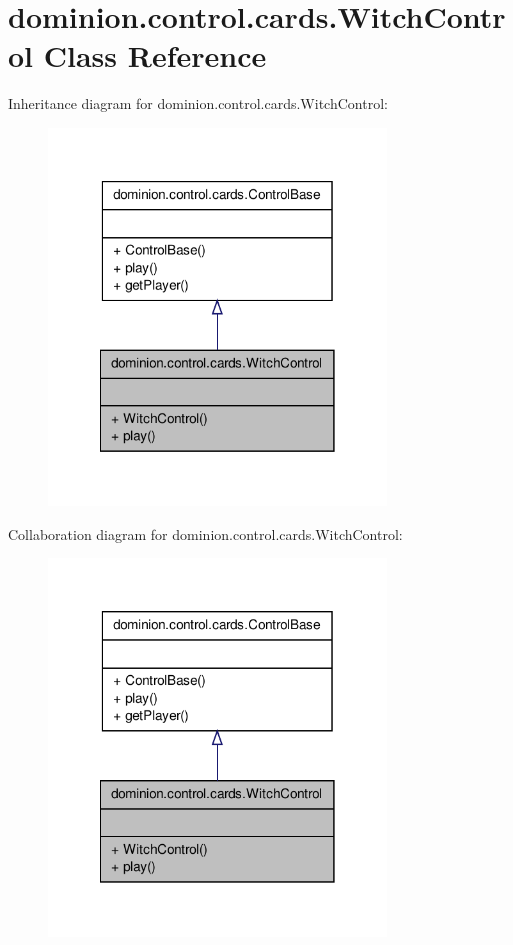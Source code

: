 \hypertarget{classdominion_1_1control_1_1cards_1_1WitchControl}{\section{dominion.\-control.\-cards.\-Witch\-Control \-Class \-Reference}
\label{classdominion_1_1control_1_1cards_1_1WitchControl}
}


\-Inheritance diagram for dominion.\-control.\-cards.\-Witch\-Control\-:
\nopagebreak
\begin{figure}[H]
\begin{center}
\leavevmode
\includegraphics[width=254pt]{classdominion_1_1control_1_1cards_1_1WitchControl__inherit__graph}
\end{center}
\end{figure}


\-Collaboration diagram for dominion.\-control.\-cards.\-Witch\-Control\-:
\nopagebreak
\begin{figure}[H]
\begin{center}
\leavevmode
\includegraphics[width=254pt]{classdominion_1_1control_1_1cards_1_1WitchControl__coll__graph}
\end{center}
\end{figure}
